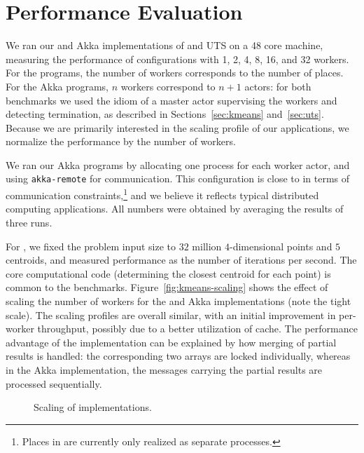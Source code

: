 \section{Performance Evaluation}
\label{sec:perf}
We ran our \apgas and Akka implementations of \kmeans and UTS on a 48 core
machine, measuring the performance of configurations with 1, 2, 4, 8, 16, and
32 workers. For the \apgas programs, the number of workers corresponds to the
number of places. For the Akka programs, $n$ workers correspond to $n+1$
actors: for both benchmarks we used the idiom of a master actor supervising the
workers and detecting termination, as described in Sections~\ref{sec:kmeans}
and~\ref{sec:uts}. Because we are primarily interested in the scaling profile of
our applications, we normalize the performance by the number of workers.

We ran our Akka programs by allocating one process for each worker actor, and
using \lstinline{akka-remote} for communication. This configuration is close to
\apgas in terms of communication constraints,\footnote{Places in \apgas are
currently only realized as separate processes.} and we believe it reflects
typical distributed computing applications. All numbers were obtained by
averaging the results of three runs.

For \kmeans, we fixed the problem input size to $32$ million $4$-dimensional
points and $5$ centroids, and measured performance as the number of iterations
per second. The core computational code (determining the closest centroid for
each point) is common to the benchmarks. Figure~\ref{fig:kmeans-scaling} shows
the effect of scaling the number of workers for the \apgas and Akka
implementations (note the tight scale). The scaling profiles are overall
similar, with an initial improvement in per-worker throughput, possibly due to
a better utilization of cache. The performance advantage of the \apgas
implementation can be explained by how merging of partial results is handled:
the corresponding two arrays are locked individually, whereas in the Akka
implementation, the messages carrying the partial results are processed
sequentially.

\begin{figure}
\vspace{-0.3cm}
\hspace{-0.2cm}
\begingroup\graphicspath{{figures/}}\endgroup
\vspace{-0.2cm}
\caption{Scaling of \kmeans implementations.}
\label{fig:uts-scaling}
\end{figure}

